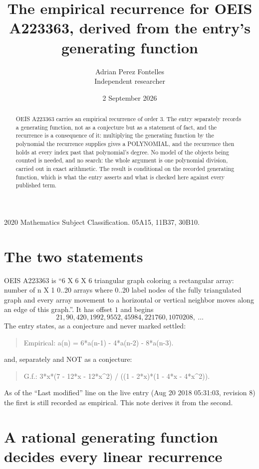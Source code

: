 \documentclass[11pt,a4paper]{article}
\title{The empirical recurrence for OEIS A223363, derived from the entry's generating function}
\author{Adrian Perez Fontelles\\ \small Independent researcher}
\date{2 September 2026}
\theoremstyle{plain}
\theoremstyle{definition}
\begin{document}
\maketitle

\begin{abstract}
OEIS A223363 carries an empirical recurrence of order $3$. The entry separately records a
generating function, not as a conjecture but as a statement of fact, and the recurrence is a
consequence of it: multiplying the generating function by the polynomial the recurrence
supplies gives a POLYNOMIAL, and the recurrence then holds at every index past that
polynomial's degree. No model of the objects being counted is needed, and no search: the
whole argument is one polynomial division, carried out in exact arithmetic. The result is
conditional on the recorded generating function, which is what the entry asserts and what is
checked here against every published term.
\end{abstract}

\noindent\small 2020 Mathematics Subject Classification. 05A15, 11B37, 30B10.\normalsize

\section{The two statements}

OEIS A223363 is ``6 X 6 X 6 triangular graph coloring a rectangular array: number of n X 1 0..20 arrays where 0..20 label nodes of the fully triangulated graph and every array movement to a horizontal or vertical neighbor moves along an edge of this graph.''. It has offset $1$ and begins
\[
21, 90, 420, 1992, 9552, 45984, 221760, 1070208,\ \dots
\]
The entry states, as a conjecture and never marked settled:
\begin{quote}
Empirical: a(n) = 6*a(n-1) - 4*a(n-2) - 8*a(n-3).
\end{quote}
and, separately and NOT as a conjecture:
\begin{quote}
G.f.: 3*x*(7 - 12*x - 12*x\^{}2) / ((1 - 2*x)*(1 - 4*x - 4*x\^{}2)).
\end{quote}
As of the ``Last modified'' line on the live entry (Aug 20 2018 05:31:03, revision 8) the first is still
recorded as empirical. This note derives it from the second.

\section{A rational generating function decides every linear recurrence}
\end{document}
